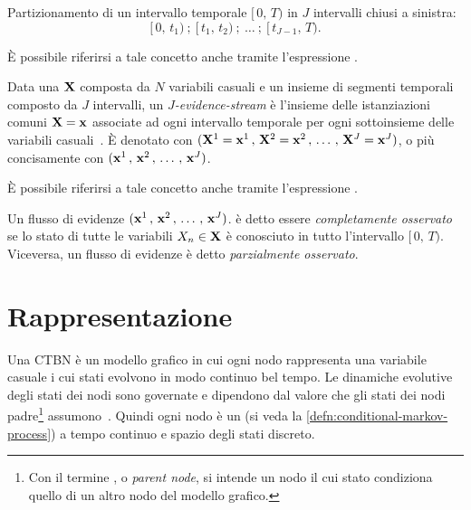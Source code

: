\begin{definizione}\label{defn:j-time-segment}
Partizionamento di un intervallo temporale $[\,0,\,T)$ in $J$ intervalli chiusi a sinistra:
\[
[\,0,\,t_1)\:;\:[\,t_1,\,t_2)\:;\:\dotsc\:;\:[\,t_{J-1},\,T)\text{.}
\]
\end{definizione}
\begin{notabene}
\`E possibile riferirsi a tale concetto anche tramite l'espressione \emph{}.
\end{notabene}
\begin{definizione}\label{defn:j-evidence-stream}
Data una \pv{} $\mathbf{X}$ composta da $N$ variabili casuali e un insieme di segmenti temporali composto da $J$ intervalli, un \emph{$J$-evidence-stream} è l'insieme delle istanziazioni comuni $\mathbf{X}=\mathbf{x}$ associate ad ogni intervallo temporale per ogni sottoinsieme delle variabili casuali~\citep{Stella2012}. \`E denotato con $(\mathbf{X}^1=\mathbf{x}^1\,,\,\mathbf{X}^2=\mathbf{x}^2\,,\,\dotsc\,,\,\mathbf{X}^J=\mathbf{x}^J)$, o più concisamente con $(\mathbf{x}^1\,,\,\mathbf{x}^2\,,\,\dotsc\,,\,\mathbf{x}^{J})$.
\end{definizione}
\begin{notabene}
\`E possibile riferirsi a tale concetto anche tramite l'espressione \emph{}.
\end{notabene}
\begin{notabene}
Un flusso di evidenze $(\mathbf{x}^1\,,\,\mathbf{x}^2\,,\,\dotsc\,,\,\mathbf{x}^{J})$. è detto essere \emph{completamente osservato} se lo stato di tutte le variabili $\mathnormal{X_n}\in\mathbf{X}$ è conosciuto in tutto l'intervallo $[\,0,\,T)$. Viceversa, un flusso di evidenze è detto \emph{parzialmente osservato}.
\end{notabene}

\section{Rappresentazione}
\label{sec:ctbn-rappresentazione}
Una \acl{CTBN} è un modello grafico in cui ogni nodo rappresenta una variabile casuale i cui stati evolvono in modo continuo bel tempo. Le dinamiche evolutive degli stati dei nodi sono governate e dipendono dal valore che gli stati dei nodi padre\footnote{Con il termine , o \emph{parent node}, si intende un nodo il cui stato condiziona quello di un altro nodo del modello grafico.} assumono~\citep{Stella2012}. Quindi ogni nodo è un \mprocess*{} \cond*{} (si veda la \autoref{defn:conditional-markov-process}) a tempo continuo e spazio degli stati discreto.

